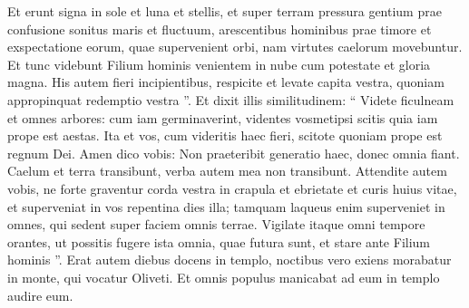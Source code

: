 \begin{biblechapter}
\begin{biblechapter}
\begin{biblechapter}
\begin{biblechapter}
\begin{biblechapter}
\begin{biblechapter}
\begin{biblechapter}
\begin{biblechapter}
\begin{biblechapter}
\begin{biblechapter}
\begin{biblechapter}
\begin{biblechapter}
\begin{biblechapter}
\begin{biblechapter}
\begin{biblechapter}
\begin{biblechapter}
\begin{biblechapter}
\begin{biblechapter}
\begin{biblechapter}
\begin{biblechapter}
\begin{biblechapter}
 \verse Et erunt signa in sole et luna et stellis, et super terram pressura gentium prae confusione sonitus maris et fluctuum, 
\verse arescentibus hominibus prae timore et exspectatione eorum, quae supervenient orbi, nam virtutes caelorum movebuntur. 
\verse Et tunc videbunt Filium hominis venientem in nube cum potestate et gloria magna.
 \verse His autem fieri incipientibus, respicite et levate capita vestra, quoniam appropinquat redemptio vestra ”.
 \verse Et dixit illis similitudinem: “ Videte ficulneam et omnes arbores: 
\verse cum iam germinaverint, videntes vosmetipsi scitis quia iam prope est aestas. 
\verse Ita et vos, cum videritis haec fieri, scitote quoniam prope est regnum Dei. 
 \verse Amen dico vobis: Non praeteribit generatio haec, donec omnia fiant. 
\verse Caelum et terra transibunt, verba autem mea non transibunt.
 \verse Attendite autem vobis, ne forte graventur corda vestra in crapula et ebrietate et curis huius vitae, et superveniat in vos repentina dies illa; 
 \verse tamquam laqueus enim superveniet in omnes, qui sedent super faciem omnis terrae. 
\verse Vigilate itaque omni tempore orantes, ut possitis fugere ista omnia, quae futura sunt, et stare ante Filium hominis ”.
 \verse Erat autem diebus docens in templo, noctibus vero exiens morabatur in monte, qui vocatur Oliveti. 
\verse Et omnis populus manicabat ad eum in templo audire eum.
 

\end{biblechapter}
\end{biblechapter}
\end{biblechapter}
\end{biblechapter}
\end{biblechapter}
\end{biblechapter}
\end{biblechapter}
\end{biblechapter}
\end{biblechapter}
\end{biblechapter}
\end{biblechapter}
\end{biblechapter}
\end{biblechapter}
\end{biblechapter}
\end{biblechapter}
\end{biblechapter}
\end{biblechapter}
\end{biblechapter}
\end{biblechapter}
\end{biblechapter}
\end{biblechapter}
